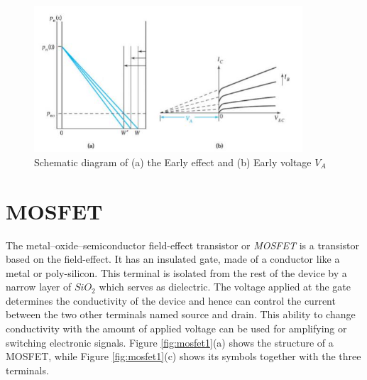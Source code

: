 \begin{figure}[h!]
\centering
\includegraphics[width=10cm]{figures/ch01/bjt7.jpg}
\caption{Schematic diagram of (a) the Early effect and (b) Early voltage $V_A$} 
\label{fig:bjt7}
\end{figure}


\newpage
\section{MOSFET}
\label{sec:mosfet}
The metal–oxide–semiconductor field-effect transistor or \emph{MOSFET} is a transistor based on the field-effect. It has an insulated gate, made of a conductor like a metal or poly-silicon. This terminal is isolated from the rest of the device by a narrow layer of $SiO_2$ which serves as dielectric. The voltage applied at the gate determines the conductivity of the device and hence can control the current between the two other terminals named source and drain. This ability to change conductivity with the amount of applied voltage can be used for amplifying or switching electronic signals. Figure \ref{fig:mosfet1}(a) shows the structure of a MOSFET, while Figure \ref{fig:mosfet1}(c) shows its symbols together with the three terminals.

